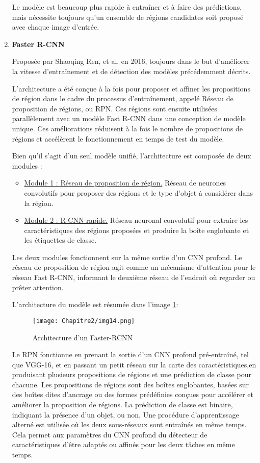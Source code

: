 \begin{enumerate}
Le modèle est beaucoup plus rapide à entraîner et à faire des prédictions, mais nécessite toujours qu'un ensemble de régions candidates soit proposé avec chaque image d'entrée.

 \item  \textbf{Faster R-CNN}\cite{faster_rcnn_paper}
 
Proposée par Shaoqing Ren, et al. en 2016, toujours dans le but d'améliorer la vitesse d'entraînement et de détection des modèles précédemment décrits.

L'architecture a été conçue à la fois pour proposer et affiner les propositions de région dans le cadre du processus d'entraînement, appelé Réseau de proposition de régions, ou RPN. Ces régions sont ensuite utilisées parallèlement avec un modèle Fast R-CNN dans une conception de modèle unique. Ces améliorations réduisent à la fois le nombre de propositions de régions et accélèrent le fonctionnement en temps de test du modèle.

Bien qu'il s'agit d'un seul modèle unifié, l'architecture est composée de deux modules :
\begin{itemize}
\item \underline{Module 1 : Réseau de proposition de région.}  Réseau de neurones convolutifs pour proposer des régions et le type d'objet à considérer dans la région.
\item \underline{Module 2 : R-CNN rapide.} Réseau neuronal convolutif pour extraire les caractéristiques des régions proposées et produire la boîte englobante et les étiquettes de classe.
\end{itemize}

Les deux modules fonctionnent sur la même sortie d'un CNN profond. Le réseau de proposition de région agit comme un mécanisme d'attention pour le réseau Fast R-CNN, informant le deuxième réseau de l'endroit où regarder ou prêter attention.

L'architecture du modèle est résumée dans l'image \ref{img14}:

\begin{figure}[H]
          \centering
          \texttt{[image: Chapitre2/img14.png]}
          \caption{Architecture d'un Faster-RCNN}
          \label{img14}
          \end{figure}
          
Le RPN fonctionne en prenant la sortie d'un CNN profond pré-entraîné, tel que VGG-16, et en passant un petit réseau sur la carte des caractéristiques,en produisant plusieurs propositions de régions et une prédiction de classe pour chacune. Les propositions de régions sont des boîtes englobantes, basées sur des boîtes dites d'ancrage ou des formes prédéfinies conçues pour accélérer et améliorer la proposition de régions. La prédiction de classe est binaire, indiquant la présence d'un objet, ou non. Une procédure d'apprentissage alterné est utilisée où les deux sous-réseaux sont entraînés en même temps. Cela permet aux paramètres du CNN profond du détecteur de caractéristiques d'être adaptés ou affinés pour les deux tâches en même temps.
 \end{enumerate} 


